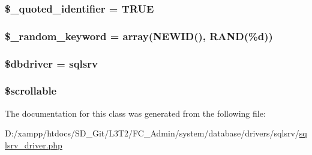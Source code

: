 \subsubsection[{\$\+\_\+quoted\+\_\+identifier}]{\setlength{\rightskip}{0pt plus 5cm}\$\+\_\+quoted\+\_\+identifier = T\+R\+U\+E\hspace{0.3cm}{\ttfamily [protected]}}\label{class_c_i___d_b__sqlsrv__driver_a1dae2f0e9ad7299438a9976d6cdbf2ad}
\hypertarget{class_c_i___d_b__sqlsrv__driver_a10213aa6e05f6d924d3277bb1d2fea00}{}
\subsubsection[{\$\+\_\+random\+\_\+keyword}]{\setlength{\rightskip}{0pt plus 5cm}\$\+\_\+random\+\_\+keyword = array(\textquotesingle{}N\+E\+W\+I\+D()\textquotesingle{}, \textquotesingle{}R\+A\+N\+D(\%{\bf d})\textquotesingle{})\hspace{0.3cm}{\ttfamily [protected]}}\label{class_c_i___d_b__sqlsrv__driver_a10213aa6e05f6d924d3277bb1d2fea00}
\hypertarget{class_c_i___d_b__sqlsrv__driver_a0cde2a16322a023d040aa7f725877597}{}
\subsubsection[{\$dbdriver}]{\setlength{\rightskip}{0pt plus 5cm}\$dbdriver = \textquotesingle{}sqlsrv\textquotesingle{}}\label{class_c_i___d_b__sqlsrv__driver_a0cde2a16322a023d040aa7f725877597}
\hypertarget{class_c_i___d_b__sqlsrv__driver_a76095eacf021915db9aabc44ecf58555}{}
\subsubsection[{\$scrollable}]{\setlength{\rightskip}{0pt plus 5cm}\$scrollable}\label{class_c_i___d_b__sqlsrv__driver_a76095eacf021915db9aabc44ecf58555}


The documentation for this class was generated from the following file\+:\begin{DoxyCompactItemize}
\item 
D\+:/xampp/htdocs/\+S\+D\+\_\+\+Git/\+L3\+T2/\+F\+C\+\_\+\+Admin/system/database/drivers/sqlsrv/\hyperlink{sqlsrv__driver_8php}{sqlsrv\+\_\+driver.\+php}\end{DoxyCompactItemize}
